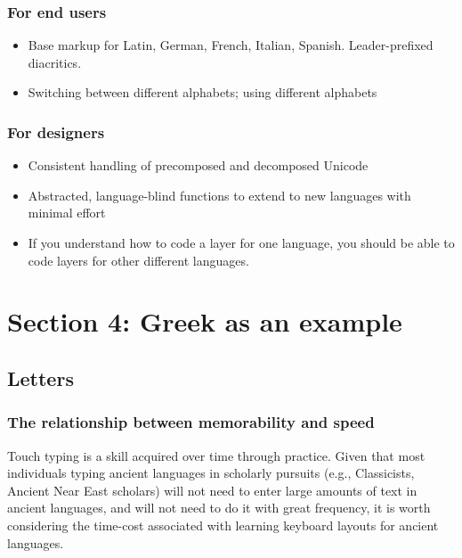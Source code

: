 \documentclass[11pt]{article}
\begin{document}
\subsubsection{For end users}
\label{sec:orgbc7b0d7}

\begin{itemize}
\item Base markup for Latin, German, French, Italian, Spanish. Leader-prefixed diacritics.
\item Switching between different alphabets; using different alphabets
\end{itemize}

\subsubsection{For designers}
\label{sec:orgd2dfc12}

\begin{itemize}
\item Consistent handling of precomposed and decomposed Unicode
\item Abstracted, language-blind functions to extend to new languages with minimal effort
\item If you understand how to code a layer for one language, you should be able to code layers for other different languages.
\end{itemize}

\section{Section 4: Greek as an example}
\label{sec:orga7712b0}

\subsection{Letters}
\label{sec:org9d4d943}

\subsubsection{The relationship between memorability and speed}
\label{sec:org5fb6b0d}

Touch typing is a skill acquired over time through practice. Given that most individuals typing ancient languages in scholarly pursuits (e.g., Classicists, Ancient Near East scholars) will not need to enter large amounts of text in ancient languages, and will not need to do it with great frequency, it is worth considering the time-cost associated with learning keyboard layouts for ancient languages.
\end{document}
